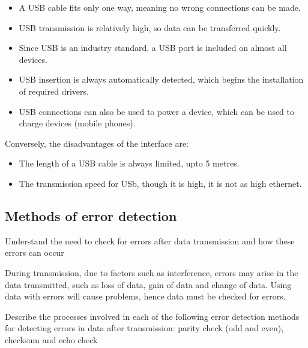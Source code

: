 \begin{itemize}
	\item A USB cable fits only one way, meaning no wrong connections can be made.
	\item USB transmission is relatively high, so data can be transferred quickly.
	\item Since USB is an industry standard, a USB port is included on almost all
		devices.
	\item USB insertion is always automatically detected, which begins the installation
		of required drivers.
	\item USB connections can also be used to power a device, which can be used to
		charge devices (mobile phones).
\end{itemize}
Conversely, the disadvantages of the interface are:
\begin{itemize}
	\item The length of a USB cable is always limited, upto 5 metres.
	\item The transmission speed for USb, though it is high, it is not as high
		ethernet.
\end{itemize}

\subsection{Methods of error detection}
\begin{point}
Understand the need to check for errors after
data transmission and how these errors can occur
\end{point}

During transmission, due to factors such as interference, errors may arise in the data
transmitted, such as loss of data, gain of data and change of data. Using data with
errors will cause problems, hence data must be checked for errors.

\begin{point}
Describe the processes involved in each of the
following error detection methods for detecting
errors in data after transmission: parity check
(odd and even), checksum and echo check
\end{point}

